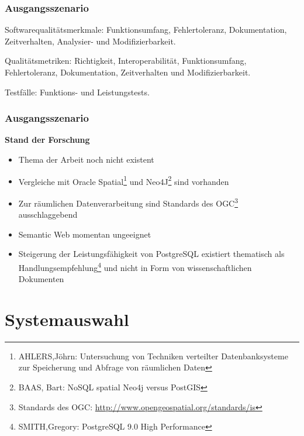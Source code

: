 \documentclass{beamer}
\begin{document}
\begin{frame}\frametitle{Ausgangsszenario}
\begin{block}{Softwarequalitätsmerkmale:}
Funktionsumfang, Fehlertoleranz, Dokumentation, Zeitverhalten, Analysier- und Modifizierbarkeit.
\end{block}

\vspace{\baselineskip}

\begin{block}{Qualitätsmetriken:}
Richtigkeit, Interoperabilität, Funktionsumfang, Fehlertoleranz, Dokumentation, Zeitverhalten und Modifizierbarkeit.
\end{block}

\vspace{\baselineskip}

\begin{block}{Testfälle:}
Funktions- und Leistungstests.
\end{block}
\end{frame}

\begin{frame}\frametitle{Ausgangsszenario}
\begin{center}
\textbf{Stand der Forschung}
\end{center}

\begin{itemize}
\item Thema der Arbeit noch nicht existent
\item Vergleiche mit Oracle Spatial\footnote{AHLERS,Jöhrn: Untersuchung von Techniken verteilter Datenbanksysteme zur Speicherung und Abfrage von räumlichen Daten} und Neo4J\footnote{BAAS, Bart: NoSQL spatial Neo4j versus PostGIS} sind vorhanden
\item Zur räumlichen Datenverarbeitung sind Standards des OGC\footnote{Standards des OGC: \url{http://www.opengeospatial.org/standards/is}} ausschlaggebend
\item Semantic Web momentan ungeeignet
\item Steigerung der Leistungsfähigkeit von PostgreSQL existiert thematisch als Handlungsempfehlung\footnote{SMITH,Gregory: PostgreSQL 9.0 High Performance} und nicht in Form von wissenschaftlichen Dokumenten
\end{itemize}

\end{frame}

\section{Systemauswahl}
\end{document}
